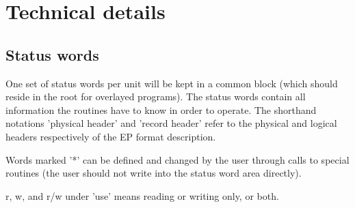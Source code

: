  
\chapter{Technical details}
\label{sec:H1TechnicalDetails}

\section{Status words}

One set of status words per unit will be kept in a common block (which
should reside in the root for overlayed programs). The status words
contain all information the routines have to know in order to operate.
The shorthand notations 'physical header' and 'record header' refer
to the physical and logical headers respectively of the EP format
description.
 
Words marked '*' can be defined and changed by the user through calls
to special routines (the user should not write into the status
word area directly).

r, w, and r/w under 'use' means reading or writing only, or both.

